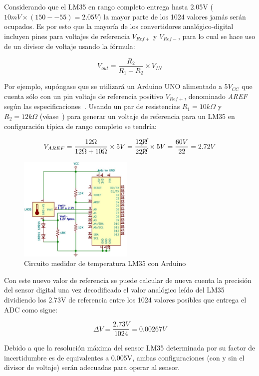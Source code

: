 Considerando que el LM35 en rango completo entrega hasta 2.05V ($10mV\times (150 - -55) = 2.05V$) la mayor parte de los 1024 valores jamás serán ocupados.
Es por esto que la mayoría de los convertidores analógico-digital incluyen pines para voltajes de referencia $V_{Ref+}$ y $V_{Ref-}$, para lo cual se hace uso de un divisor de voltaje usando la fórmula:

\begin{equation}
\label{eqn:vdiv}
V_{out}= \frac{ R_2 }{ R_1 + R_2 } \times V_{IN}
\end{equation}

Por ejemplo, supóngase que se utilizará un Arduino UNO alimentado a $5V_{CC}$ que cuenta sólo con un pin voltaje de referencia positivo $V_{Ref+}$, denominado \emph{AREF} según las especificaciones~.
Usando un par de resistencias $R_1 = 10k\Omega$ y $R_2 = 12k\Omega$ (véase~) para generar un voltaje de referencia para un LM35 en configuración típica de rango completo se tendría:

\begin{equation}
V_{AREF}
	= \frac{ 12\Omega }{ 12\Omega + 10\Omega } \times 5V
	= \frac{ 12\cancel{\Omega} }{ 22\cancel{\Omega} } \times 5V
	= \frac{ 60V }{ 22 } = 2.72V
\end{equation}

\begin{figure}
	\centering
	\includegraphics[width=\textwidth,height=5cm,keepaspectratio]{img/lm35-arduino.jpg}
	\caption{Circuito medidor de temperatura LM35 con Arduino}
	\label{fig:lm35-arduino} %
\end{figure}

Con este nuevo valor de referencia se puede calcular de nueva cuenta la precisión del sensor digital una vez decodificado el valor analógico leído del LM35 dividiendo los 2.73V de referencia entre los 1024 valores posibles que entrega el ADC como sigue:

\begin{equation}
\Delta V = \frac{ 2.73V }{ 1024 } =  0.00267V
\end{equation}

Debido a que la resolución máxima del sensor LM35 determinada por su factor de incertidumbre es de  equivalentes a 0.005V, ambas configuraciones (con y sin el divisor de voltaje) serán adecuadas para operar al sensor.